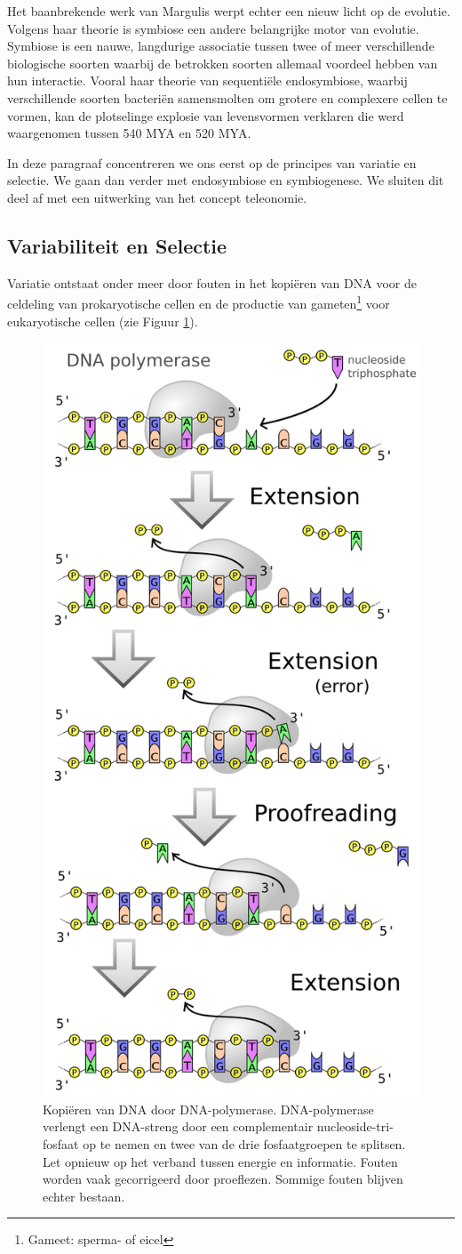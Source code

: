 \documentclass[
  11pt,
]{book}
\begin{document}
Het baanbrekende werk van Margulis werpt echter een nieuw licht op de evolutie. Volgens haar theorie is symbiose een andere belangrijke motor van evolutie. Symbiose is een nauwe, langdurige associatie tussen twee of meer verschillende biologische soorten waarbij de betrokken soorten allemaal voordeel hebben van hun interactie. Vooral haar theorie van sequentiële endosymbiose, waarbij verschillende soorten bacteriën samensmolten om grotere en complexere cellen te vormen, kan de plotselinge explosie van levensvormen verklaren die werd waargenomen tussen 540 MYA en 520 MYA.

In deze paragraaf concentreren we ons eerst op de principes van variatie en selectie. We gaan dan verder met endosymbiose en symbiogenese. We sluiten dit deel af met een uitwerking van het concept teleonomie.

\hypertarget{variabiliteit-en-selectie}{%
\subsection{Variabiliteit en Selectie}\label{variabiliteit-en-selectie}}

Variatie ontstaat onder meer door fouten in het kopiëren van DNA voor de celdeling van prokaryotische cellen en de productie van gameten\footnote{Gameet: sperma- of eicel} voor eukaryotische cellen (zie Figuur \ref{fig:dnaPolymerase}).

\begin{figure}

{\centering \includegraphics[width=0.45\linewidth]{./figs/DNA_polymerase} 

}

\caption{Kopiëren van DNA door DNA-polymerase. DNA-polymerase verlengt een DNA-streng door een complementair nucleoside-tri-fosfaat op te nemen en twee van de drie fosfaatgroepen te splitsen. Let opnieuw op het verband tussen energie en informatie. Fouten worden vaak gecorrigeerd door proeflezen. Sommige fouten blijven echter bestaan.}\label{fig:dnaPolymerase}
\end{figure}
\end{document}
